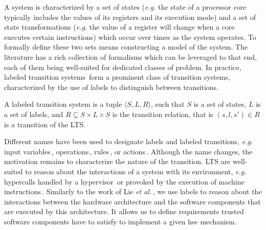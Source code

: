 A system is characterized by a set of states (\emph{e.g.} the state of a
processor core typically includes the values of its registers and its execution
mode) and a set of state transformations (\emph{e.g.}  the value of a register
will change when a core executes certain instructions) which occur over times as
the system operates.
%
To formally define these two sets means constructing a model of the system. 
%
The literature has a rich collection of formalisms  which can be leveraged to
that end, each of them being well-suited for dedicated classes of problem.
%
In practice, labeled transition systems\,\cite{loiseaux1995lts} form a prominent
class of transition systems, characterized by the use of labels to distinguish
between transitions.

\begin{definition}
  A labeled transition system is a tuple \( \langle S, L, R \rangle \), such
  that \( S \) is a set of states, \( L \) is a set of labels, and
  \( R \subseteq S \times L \times S \) is the transition relation, that is
  \( (s, l, s') \in R \) is a transition of the LTS.
\end{definition}

Different names have been used to designate labels and labeled
transitions, \emph{e.g.} input variables\,\cite{cimatti2002nusmv},
operations\,\cite{jackson2012alloy}, rules\,\cite{murphi}, or 
actions\,\cite{barthe2011virtcert1}.
%
Although the name changes, the motivation remains to characterize the nature of
the transition.
%
LTS are well-suited to reason about the interactions of a system with its
environment, \emph{e.g.} hypercalls handled by a
hypervisor\,\cite{barthe2011virtcert1} or \IOs provoked by the execution of
machine instructions\,\cite{lie2003xom}.
%
Similarly to the work of Lie \textit{et al.}\,\cite{lie2003xom}, we use labels to reason about
the interactions between the hardware architecture and the software components
that are executed by this architecture.
%
It allows us to define requirements trusted software components have to satisfy
to implement a given \ac{hse} mechanism.


